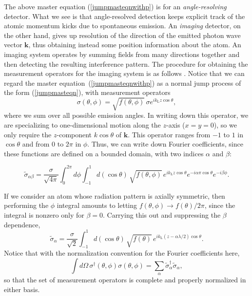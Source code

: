 \documentclass[aps,twocolumn,superscriptaddress,footinbib,floatfix,showpacs]{revtex4}
\def\kL{k_\mathrm{\scriptscriptstyle L}}
\begin{document}
The above master equation (\ref{jumpmasteqnwithp})
is for an \textit{angle-resolving} detector.  What we see is that angle-resolved
detection keeps explicit track of the atomic momentum kicks due to 
spontaneous emission.
An \textit{imaging} detector, on the other hand, gives up resolution
of the direction of the emitted photon wave vector $\mathbf{k}$,
thus obtaining instead some position information about the atom.
An imaging system operates by summing fields from many directions together
and then detecting the resulting interference pattern.
The procedure for obtaining the measurement operators for
the imaging system is as follows \cite{Holland96, Greenwood97}.
Notice that we can regard the master equation~(\ref{jumpmasteqnwithp})
as a normal jump process of the form
(\ref{jumpmasteqn}), with measurement operators
\begin{equation}
  \sigma(\theta,\phi) = \sqrt{f(\theta,\phi)}\,\sigma e^{i\kL z\cos\theta},
\end{equation}
where we sum over all possible emission angles.  In writing down
this operator, we are specializing to one-dimensional motion along
the $z$-axis ($x=y=0$), so we only require the $z$-component 
$k\cos\theta$ of $\mathbf{k}$.
This operator ranges from $-1$ to $1$ in $\cos\theta$ and from
$0$ to $2\pi$ in $\phi$.
Thus, we can write down Fourier coefficients, since these
functions are defined on a bounded domain, with two indices
$\alpha$ and $\beta$:
\begin{widetext}
\begin{equation}
  \tilde \sigma_{\alpha\beta} = 
    \frac{\sigma}{\sqrt{4\pi}} \int_0^{2\pi} d\phi \int_{-1}^1
     d(\cos\theta)\,\sqrt{f(\theta,\phi)}\, e^{i\kL z\cos\theta} 
     e^{-i\alpha\pi\cos\theta} e^{-i\beta\phi}.
  \label{sigmaab}
\end{equation}
\end{widetext}
If we consider an atom whose radiation pattern is axially symmetric,
then performing the $\phi$ integral
amounts to letting $f(\theta,\phi)\longrightarrow f(\theta)/2\pi$,
since the integral is nonzero only for $\beta=0$.  Carrying this
out and suppressing the $\beta$ dependence,
\begin{equation}
  \tilde \sigma_{\alpha} = 
    \frac{\sigma}{\sqrt{2}}  \int_{-1}^1
     d(\cos\theta)\,\sqrt{f(\theta)}\, 
     e^{i\kL (z-\alpha\lambda/2)\cos\theta}.
  \label{sigmaab2}
\end{equation}
Notice that with the normalization convention for the Fourier coefficients
here,
\begin{equation}
  \int d\Omega\,\sigma^\dagger(\theta,\phi)\sigma(\theta,\phi)
   =\sum_\alpha \tilde\sigma^\dagger_\alpha \tilde \sigma_\alpha,
\end{equation}
so that the set of measurement operators is complete and properly normalized
in either basis.
\end{document}
